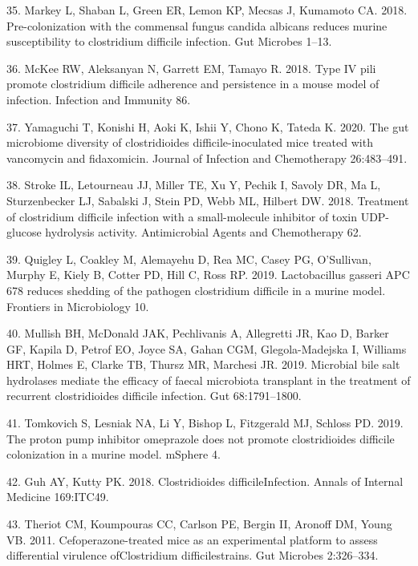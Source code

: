 \documentclass[11pt,]{article}
\begin{document}
\hypertarget{ref-Markey2018}{}
35. Markey L, Shaban L, Green ER, Lemon KP, Mecsas J, Kumamoto CA. 2018.
Pre-colonization with the commensal fungus candida albicans reduces
murine susceptibility to clostridium difficile infection. Gut Microbes
1--13.

\hypertarget{ref-McKee2018}{}
36. McKee RW, Aleksanyan N, Garrett EM, Tamayo R. 2018. Type IV pili
promote clostridium difficile adherence and persistence in a mouse model
of infection. Infection and Immunity 86.

\hypertarget{ref-Yamaguchi2020}{}
37. Yamaguchi T, Konishi H, Aoki K, Ishii Y, Chono K, Tateda K. 2020.
The gut microbiome diversity of clostridioides difficile-inoculated mice
treated with vancomycin and fidaxomicin. Journal of Infection and
Chemotherapy 26:483--491.

\hypertarget{ref-Stroke2018}{}
38. Stroke IL, Letourneau JJ, Miller TE, Xu Y, Pechik I, Savoly DR, Ma
L, Sturzenbecker LJ, Sabalski J, Stein PD, Webb ML, Hilbert DW. 2018.
Treatment of clostridium difficile infection with a small-molecule
inhibitor of toxin UDP-glucose hydrolysis activity. Antimicrobial Agents
and Chemotherapy 62.

\hypertarget{ref-Quigley2019}{}
39. Quigley L, Coakley M, Alemayehu D, Rea MC, Casey PG, O'Sullivan,
Murphy E, Kiely B, Cotter PD, Hill C, Ross RP. 2019. Lactobacillus
gasseri APC 678 reduces shedding of the pathogen clostridium difficile
in a murine model. Frontiers in Microbiology 10.

\hypertarget{ref-Mullish2019}{}
40. Mullish BH, McDonald JAK, Pechlivanis A, Allegretti JR, Kao D,
Barker GF, Kapila D, Petrof EO, Joyce SA, Gahan CGM, Glegola-Madejska I,
Williams HRT, Holmes E, Clarke TB, Thursz MR, Marchesi JR. 2019.
Microbial bile salt hydrolases mediate the efficacy of faecal microbiota
transplant in the treatment of recurrent clostridioides difficile
infection. Gut 68:1791--1800.

\hypertarget{ref-Tomkovich2019}{}
41. Tomkovich S, Lesniak NA, Li Y, Bishop L, Fitzgerald MJ, Schloss PD.
2019. The proton pump inhibitor omeprazole does not promote
clostridioides difficile colonization in a murine model. mSphere 4.

\hypertarget{ref-Guh2018}{}
42. Guh AY, Kutty PK. 2018. Clostridioides difficileInfection. Annals of
Internal Medicine 169:ITC49.

\hypertarget{ref-Theriot2011}{}
43. Theriot CM, Koumpouras CC, Carlson PE, Bergin II, Aronoff DM, Young
VB. 2011. Cefoperazone-treated mice as an experimental platform to
assess differential virulence ofClostridium difficilestrains. Gut
Microbes 2:326--334.
\end{document}
